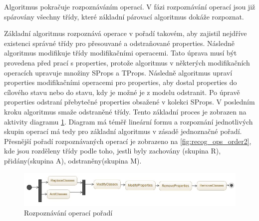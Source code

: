 \documentclass[11pt,twoside,a4paper]{book}
\begin{document}
Algoritmus pokračuje rozpoznáváním operací. V fázi rozpoznávání operací jsou
již spárovány všechny třídy, které základní párovací algoritmus dokáže
rozpoznat. 

Základní algoritmus rozpoznává operace v pořadí takovém, aby zajistil nejdříve
existenci správné třídy pro přesouvané a odstraňované properties.
Následně algoritmus modifikuje třídy modifikačními operacemi. Tato úprava musí
být provedena před prací s properties, protože algoritmus v některých
modifikačních operacích upravuje množiny SProps a TProps. Následně algoritmus
upraví properties modifikačními operacemi pro properties, aby dostal
properties do cílového stavu nebo do stavu, kdy je možné je z modelu
odstranit. Po úpravě properties odstraní přebytečné properties obsažené v
kolekci SProps. V posledním kroku algoritmus smaže odstraněné třídy. Tento
základní proces je zobrazen na aktivity diagramu \ref{fig:recog_ops_order1}.
Diagram má téměř lineární formu a rozpoznání jednotlivých skupin operací má
tedy pro základní algoritmus v zásadě jednoznačné pořadí. Přesnější pořadí
rozpoznávaných operací je zobrazeno na \ref{fig:recog_ops_order2}, kde jsou
rozděleny třídy podle toho, jestli byly zachovány (skupina R), přidány(skupina
A), odstraněny(skupina M).

\begin{figure}[H]
\begin{center}
\includegraphics[width=15cm]{figures/recognition_order_basic1.jpg}
\caption{Rozpoznávání operací pořadí}
\label{fig:recog_ops_order1}
\end{center}
\end{figure}
\end{document}
